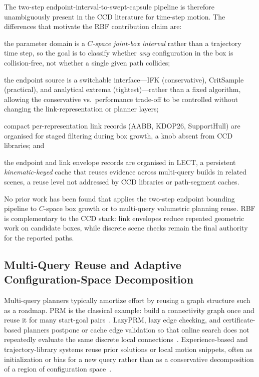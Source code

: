\documentclass[journal]{IEEEtran}
\DeclareRobustCommand{\textsc}[1]{\textnormal{\MakeUppercase{#1}}}
\newcommand{\rbf}{\textsc{RBF}}
\begin{document}
The two-step endpoint-interval-to-swept-capsule pipeline is therefore
unambiguously present in the CCD literature for time-step motion.
The differences that motivate the \rbf{} contribution claim are:
\begin{enumerate*}[label=(\alph*)]
  \item the parameter domain is a \emph{$C$-space joint-box interval} rather
    than a trajectory time step, so the goal is to classify whether \emph{any}
    configuration in the box is collision-free, not whether a single given path
    collides;
  \item the endpoint source is a switchable interface---IFK (conservative),
    CritSample (practical), and analytical extrema (tightest)---rather than a
    fixed algorithm, allowing the conservative vs.\ performance trade-off to be
    controlled without changing the link-representation or planner layers;
  \item compact per-representation link records (AABB, KDOP26, SupportHull) are
    organised for staged filtering during box growth, a knob absent from CCD
    libraries; and
  \item the endpoint and link envelope records are organised in LECT, a
    persistent \emph{kinematic-keyed} cache that reuses evidence across
    multi-query builds in related scenes, a reuse level not addressed by CCD
    libraries or path-segment caches.
\end{enumerate*}
No prior work has been found that applies the two-step endpoint bounding
pipeline to $C$-space box growth or to multi-query volumetric planning reuse.
\rbf{} is complementary to the CCD stack: link envelopes reduce repeated
geometric work on candidate boxes, while discrete scene checks remain the final
authority for the reported paths.

\subsection{Multi-Query Reuse and Adaptive Configuration-Space Decomposition}

Multi-query planners typically amortize effort by reusing a graph structure such
as a roadmap. PRM is the classical example: build a connectivity graph once and
reuse it for many start-goal pairs~\cite{kavraki1996probabilistic,
bohlin2000path}. LazyPRM, lazy edge checking, and certificate-based planners
postpone or cache edge validation so that online search does not repeatedly
evaluate the same discrete local connections~\cite{dellin2016unifying,
schmerling2015optimal}. Experience-based and trajectory-library systems reuse
prior solutions or local motion snippets, often as initialization or bias for a
new query rather than as a conservative decomposition of a region of
configuration space~\cite{coleman2014moveit}.
\end{document}
